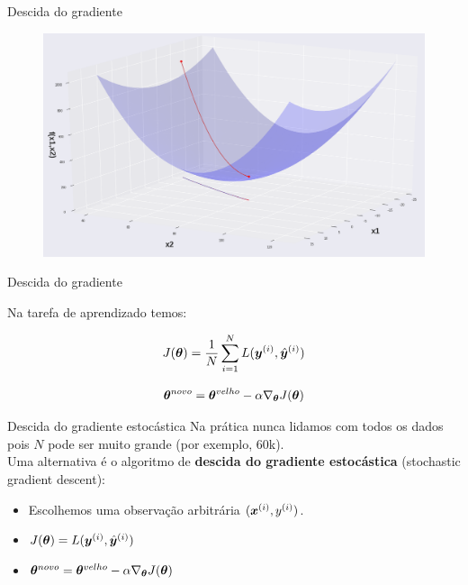 \documentclass[10pt]{beamer}
\begin{document}
\begin{frame}[fragile]{Descida do gradiente}

\begin{figure}
\centering
\includegraphics[width=1.0\linewidth]{images/Minimization_image.png}
\end{figure}

\end{frame}

\begin{frame}[fragile]{Descida do gradiente}
\Large{
Na tarefa de aprendizado temos:

\begin{equation*}
J(\bm{\theta}) = \frac{1}{N}\sum_{i=1}^{N} L(\bm{y}^{(i)}, {\hat{\bm{y}}}^{(i)})
\end{equation*}

\begin{equation*}
\bm{\theta}^{novo} = \bm{\theta}^{velho} - \alpha \nabla_{\bm{\theta}} {J(\bm{\theta})}
\end{equation*}
}
\end{frame}

\begin{frame}[fragile]{Descida do gradiente estocástica}
Na prática nunca lidamos com todos os dados pois $N$ pode ser muito grande (por exemplo, $60$k).\\

Uma alternativa é o algoritmo de \textbf{descida do gradiente estocástica} (\alert{stochastic gradient descent}):

\begin{itemize}
\item Escolhemos uma observação arbitrária $(\bm{x}^{(i)},y^{(i)})$.
\vspace{0.3cm}
\item $J(\bm{\theta}) = L(\bm{y}^{(i)}, {\hat{\bm{y}}}^{(i)})$
\vspace{0.3cm}
\item $\bm{\theta}^{novo} = \bm{\theta}^{velho} - \alpha \nabla_{\bm{\theta}} {J(\bm{\theta})}$
\end{itemize}

\end{frame}
\end{document}
